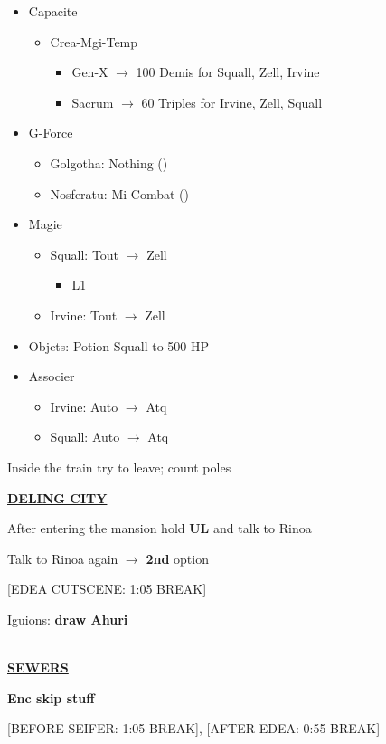 \begin{menu}
	\begin{itemize}
		\item Capacite
			\begin{itemize}
				\item Crea-Mgi-Temp
					\begin{itemize}
						\item Gen-X $\rightarrow$ 100 Demis for Squall, Zell, Irvine
						\item Sacrum $\rightarrow$ 60 Triples for Irvine, Zell, Squall
					\end{itemize}
			\end{itemize}
		\item G-Force
			\begin{itemize}
				\item Golgotha: Nothing ()
				\item Nosferatu: Mi-Combat ()
			\end{itemize}
		\item Magie
			\begin{itemize}
				\item Squall: Tout $\rightarrow$ Zell
					\begin{itemize}
						\item L1
					\end{itemize}
				\item Irvine: Tout $\rightarrow$ Zell 
			\end{itemize}
		\item Objets: Potion Squall to 500 HP
		\item Associer
			\begin{itemize}
				\item Irvine: Auto $\rightarrow$ Atq
				\item Squall: Auto $\rightarrow$ Atq
			\end{itemize}
	\end{itemize}
\end{menu}

Inside the train try to leave; count poles

\newpage
\underline{\textbf{DELING CITY}}

After entering the mansion hold \textbf{UL} and talk to Rinoa

Talk to Rinoa again $\rightarrow$ \textbf{2nd} option

[EDEA CUTSCENE: 1:05 BREAK]

Iguions: \textbf{draw Ahuri}

\leavevmode\\
\underline{\textbf{SEWERS}}

\textbf{Enc skip stuff}

[BEFORE SEIFER: 1:05 BREAK], [AFTER EDEA: 0:55 BREAK]


